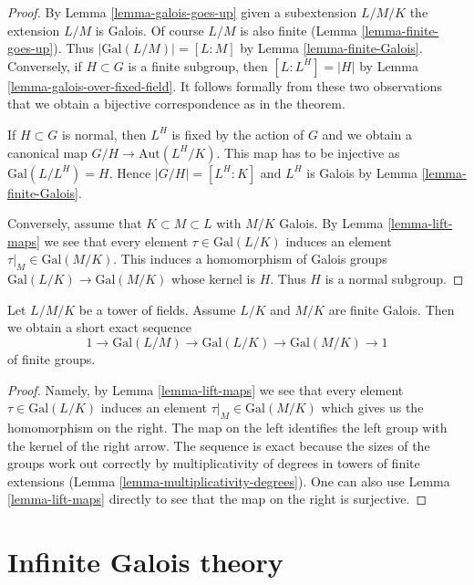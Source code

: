 \begin{proof}
By Lemma \ref{lemma-galois-goes-up} given a subextension $L/M/K$
the extension $L/M$ is Galois. Of course $L/M$ is also finite
(Lemma \ref{lemma-finite-goes-up}). Thus $|\text{Gal}(L/M)| = [L : M]$
by Lemma \ref{lemma-finite-Galois}.
Conversely, if $H \subset G$ is a finite subgroup, then
$[L : L^H] = |H|$ by Lemma \ref{lemma-galois-over-fixed-field}.
It follows formally from these two observations that we obtain
a bijective correspondence as in the theorem.

\medskip\noindent
If $H \subset G$ is normal, then $L^H$ is fixed by the action of
$G$ and we obtain a canonical map $G/H \to \text{Aut}(L^H/K)$.
This map has to be injective as $\text{Gal}(L/L^H) = H$. Hence
$|G/H| = [L^H : K]$ and $L^H$ is Galois by
Lemma \ref{lemma-finite-Galois}.

\medskip\noindent
Conversely, assume that $K \subset M \subset L$ with $M/K$ Galois.
By Lemma \ref{lemma-lift-maps} we see that every
element $\tau \in \text{Gal}(L/K)$ induces an element
$\tau|_M \in \text{Gal}(M/K)$. This induces a homomorphism
of Galois groups $\text{Gal}(L/K) \to \text{Gal}(M/K)$ whose
kernel is $H$. Thus $H$ is a normal subgroup.
\end{proof}

\begin{lemma}
\label{lemma-ses-galois}
Let $L/M/K$ be a tower of fields. Assume $L/K$ and $M/K$ are finite Galois.
Then we obtain a short exact sequence
$$
1 \to \text{Gal}(L/M) \to \text{Gal}(L/K) \to \text{Gal}(M/K) \to 1
$$
of finite groups.
\end{lemma}

\begin{proof}
Namely, by Lemma \ref{lemma-lift-maps}
we see that every element $\tau \in \text{Gal}(L/K)$ induces an element
$\tau|_M \in \text{Gal}(M/K)$ which gives us the homomorphism on the
right. The map on the left identifies the left group with the kernel
of the right arrow. The sequence is exact because the sizes
of the groups work out correctly by multiplicativity of degrees
in towers of finite extensions
(Lemma \ref{lemma-multiplicativity-degrees}).
One can also use Lemma \ref{lemma-lift-maps}
directly to see that the map on the right is surjective.
\end{proof}






\section{Infinite Galois theory}
\label{section-infinite-galois}

